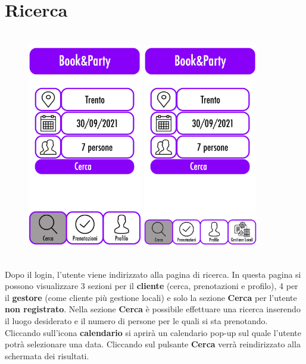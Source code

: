 \section{Ricerca}
\begin{figure}[h]
    \centering
    \includegraphics[width=5cm, height=10cm]{mockup/03-cerca-cliente.jpg}
    \qquad\qquad
    \includegraphics[width=5cm, height=10cm]{mockup/04-cerca-gestore.jpg}
    \label{fig:cerca}
\end{figure}

Dopo il login, l'utente viene indirizzato alla pagina di ricerca.
In questa pagina si possono visualizzare 3 sezioni per il \textbf{cliente} (cerca,
prenotazioni e profilo), 4 per il \textbf{gestore} (come cliente più gestione locali) e
solo la sezione \textbf{Cerca} per l'utente \textbf{non registrato}.
Nella sezione \textbf{Cerca} è possibile effettuare una ricerca inserendo il luogo 
desiderato e il numero di persone per le quali si sta prenotando. Cliccando sull'icona
\textbf{calendario} si aprirà un calendario pop-up sul quale l'utente potrà selezionare
una data. 
Cliccando sul pulsante \textbf{Cerca} verrà reindirizzato alla schermata dei risultati.

